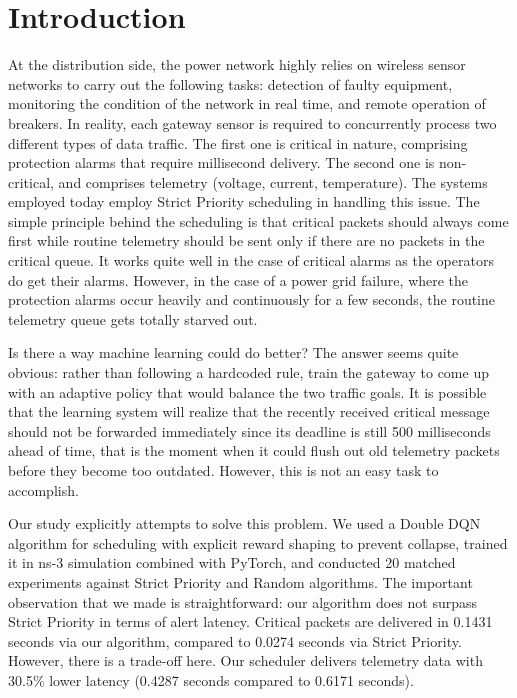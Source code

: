 \documentclass[runningheads]{llncs}
\begin{document}
\section{Introduction}
At the distribution side, the power network highly relies on wireless sensor networks to carry out the following tasks: detection of faulty equipment, monitoring the condition of the network in real time, and remote operation of breakers. In reality, each gateway sensor is required to concurrently process two different types of data traffic. The first one is critical in nature, comprising protection alarms that require millisecond delivery. The second one is non-critical, and comprises telemetry (voltage, current, temperature). The systems employed today employ Strict Priority scheduling in handling this issue. The simple principle behind the scheduling is that critical packets should always come first while routine telemetry should be sent only if there are no packets in the critical queue. It works quite well in the case of critical alarms as the operators do get their alarms. However, in the case of a power grid failure, where the protection alarms occur heavily and continuously for a few seconds, the routine telemetry queue gets totally starved out.

Is there a way machine learning could do better? The answer seems quite obvious: rather than following a hardcoded rule, train the gateway to come up with an adaptive policy that would balance the two traffic goals. It is possible that the learning system will realize that the recently received critical message should not be forwarded immediately since its deadline is still 500 milliseconds ahead of time, that is the moment when it could flush out old telemetry packets before they become too outdated. However, this is not an easy task to accomplish.

Our study explicitly attempts to solve this problem. We used a Double DQN algorithm for scheduling with explicit reward shaping to prevent collapse, trained it in ns-3 simulation combined with PyTorch, and conducted 20 matched experiments against Strict Priority and Random algorithms. The important observation that we made is straightforward: our algorithm does not surpass Strict Priority in terms of alert latency. Critical packets are delivered in 0.1431 seconds via our algorithm, compared to 0.0274 seconds via Strict Priority. However, there is a trade-off here. Our scheduler delivers telemetry data with 30.5\% lower latency (0.4287 seconds compared to 0.6171 seconds).
\end{document}
